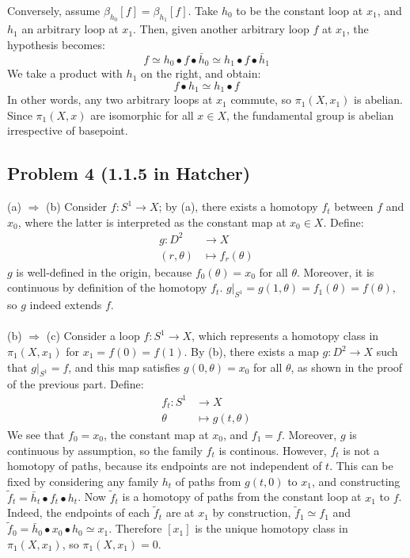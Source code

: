 \documentclass[12 pt]{article}
\begin{document}
Conversely, assume $\beta_{h_0} [f] = \beta_{h_1} [f]$. Take $h_0$ to be the constant loop at $x_1$, and $h_1$ an arbitrary loop at $x_1$. Then, given another arbitrary loop $f$ at $x_1$, the hypothesis becomes:
\[      f \simeq  h_0 \bullet f \bullet \bar h_0 \simeq h_1 \bullet f \bullet \bar h_1    \]
We take a product with $h_1$ on the right, and obtain:
\[       f \bullet h_1 \simeq h_1 \bullet f    \]
In other words, any two arbitrary loops at $x_1$ commute, so $\pi_1 (X, x_1)$ is abelian. Since $\pi_1(X,x)$ are isomorphic for all $x \in X$, the fundamental group is abelian irrespective of basepoint.


\subsection*{Problem 4 (1.1.5 in Hatcher)}
(a) $\Rightarrow$ (b) Consider $f: S^1 \to X$; by (a), there exists a homotopy $f_t$ between $f$ and $x_0$, where the latter is interpreted as the constant map at $x_0 \in X$. Define:
\begin{align*}
g : D^2 &\to X \\
(r, \theta) &\mapsto f_r(\theta)
\end{align*}
$g$ is well-defined in the origin, because $f_0(\theta) = x_0$ for all $\theta$. Moreover, it is continuous by definition of the homotopy $f_t$. $g|_{S^1} = g(1, \theta) = f_1(\theta) = f(\theta)$, so $g$ indeed extends $f$.
\\
\\
(b) $\Rightarrow$ (c) Consider a loop $f : S^1 \to X$, which represents a homotopy class in $\pi_1(X,x_1)$ for $x_1 = f(0) = f(1)$. By (b), there exists a map $g: D^2 \to X$ such that $g|_{S^1} = f$, and this map satisfies $g(0, \theta) = x_0$ for all $\theta$, as shown in the proof of the previous part. Define:
\begin{align*}
f_t : S^1 &\to X \\
\theta &\mapsto g(t, \theta)
\end{align*}
We see that $f_0 = x_0$, the constant map at $x_0$, and $f_1 = f$. Moreover, $g$ is continuous by assumption, so the family $f_t$ is continous. However, $f_t$ is not a homotopy of paths, because its endpoints are not independent of $t$. This can be fixed by considering any family $h_t$ of paths from $g(t,0)$ to $x_1$, and constructing $\tilde f_t = \bar h_t \bullet f_t \bullet h_t$. Now $\tilde f_t$ is a homotopy of paths from the constant loop at $x_1$ to $f$. Indeed, the endpoints of each $\tilde f_t$ are at $x_1$ by construction, $\tilde f_1 \simeq f_1$ and $\tilde f_0 = \bar h_0 \bullet x_0 \bullet h_0 \simeq x_1$. Therefore $[x_1]$ is the unique homotopy class in $\pi_1(X, x_1)$, so $\pi_1 (X,x_1) = 0$.
\end{document}
